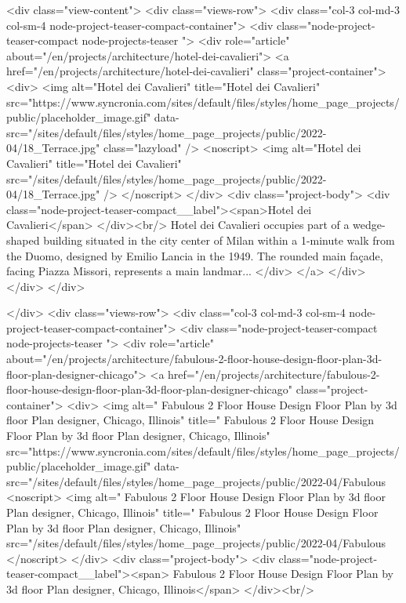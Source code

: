     
      
      <div class="view-content">
          <div class="views-row">
    <div class="col-3 col-md-3 col-sm-4 node-project-teaser-compact-container">
	<div class="node-project-teaser-compact node-projects-teaser ">
		<div  role="article" about="/en/projects/architecture/hotel-dei-cavalieri">
			<a href="/en/projects/architecture/hotel-dei-cavalieri" class="project-container">
				<div>
					<img alt="Hotel dei Cavalieri" title="Hotel dei Cavalieri" src="https://www.syncronia.com/sites/default/files/styles/home_page_projects/public/placeholder_image.gif" data-src="/sites/default/files/styles/home_page_projects/public/2022-04/18_Terrace.jpg" class="lazyload" />
					<noscript>
						<img alt="Hotel dei Cavalieri" title="Hotel dei Cavalieri" src="/sites/default/files/styles/home_page_projects/public/2022-04/18_Terrace.jpg" />
					</noscript>
				</div>
				<div class="project-body">
				<div class="node-project-teaser-compact__label"><span>Hotel dei Cavalieri</span>
</div><br/>
				Hotel dei Cavalieri occupies part of a wedge-shaped building situated in the city center of Milan within a 1-minute walk from the Duomo, designed by Emilio Lancia in the 1949. The rounded main façade, facing Piazza Missori, represents a main landmar...
				</div>
			</a>
		</div>
	</div>
</div>


  </div>
    <div class="views-row">
    <div class="col-3 col-md-3 col-sm-4 node-project-teaser-compact-container">
	<div class="node-project-teaser-compact node-projects-teaser ">
		<div  role="article" about="/en/projects/architecture/fabulous-2-floor-house-design-floor-plan-3d-floor-plan-designer-chicago">
			<a href="/en/projects/architecture/fabulous-2-floor-house-design-floor-plan-3d-floor-plan-designer-chicago" class="project-container">
				<div>
					<img alt=" Fabulous 2 Floor House Design Floor Plan by 3d floor Plan designer, Chicago, Illinois" title=" Fabulous 2 Floor House Design Floor Plan by 3d floor Plan designer, Chicago, Illinois" src="https://www.syncronia.com/sites/default/files/styles/home_page_projects/public/placeholder_image.gif" data-src="/sites/default/files/styles/home_page_projects/public/2022-04/Fabulous%
					<noscript>
						<img alt=" Fabulous 2 Floor House Design Floor Plan by 3d floor Plan designer, Chicago, Illinois" title=" Fabulous 2 Floor House Design Floor Plan by 3d floor Plan designer, Chicago, Illinois" src="/sites/default/files/styles/home_page_projects/public/2022-04/Fabulous%
					</noscript>
				</div>
				<div class="project-body">
				<div class="node-project-teaser-compact__label"><span> Fabulous 2 Floor House Design Floor Plan by 3d floor Plan designer, Chicago, Illinois</span>
</div><br/>
				
